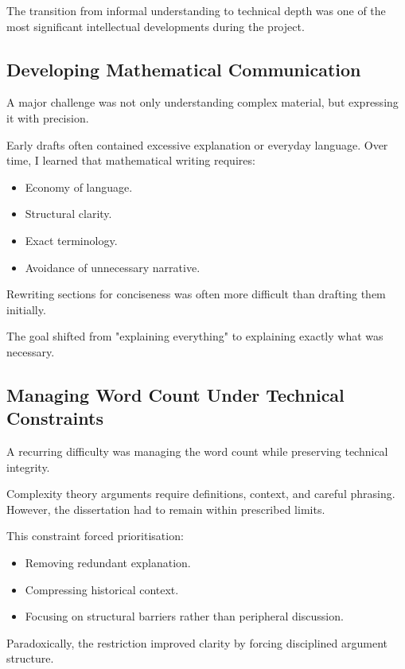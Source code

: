 \documentclass[12pt]{article}
\begin{document}
The transition from informal understanding to technical depth was one of the most significant intellectual developments during the project.

\subsection*{Developing Mathematical Communication}

A major challenge was not only understanding complex material, but expressing it with precision.

Early drafts often contained excessive explanation or everyday language. Over time, I learned that mathematical writing requires:

\begin{itemize}
\item Economy of language.
\item Structural clarity.
\item Exact terminology.
\item Avoidance of unnecessary narrative.
\end{itemize}

Rewriting sections for conciseness was often more difficult than drafting them initially.

The goal shifted from "explaining everything" to explaining exactly what was necessary.

\subsection*{Managing Word Count Under Technical Constraints}

A recurring difficulty was managing the word count while preserving technical integrity.

Complexity theory arguments require definitions, context, and careful phrasing. However, the dissertation had to remain within prescribed limits.

This constraint forced prioritisation:

\begin{itemize}
\item Removing redundant explanation.
\item Compressing historical context.
\item Focusing on structural barriers rather than peripheral discussion.
\end{itemize}

Paradoxically, the restriction improved clarity by forcing disciplined argument structure.
\end{document}
